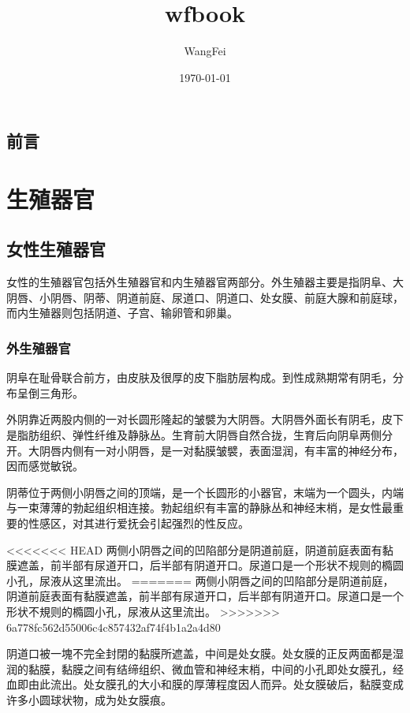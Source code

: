 \documentclass[12pt,UTF8]{ctexbook}
\title{\heiti\zihao{0} wfbook}
\author{WangFei}
\date{\today}
\begin{document}
\maketitle
\tableofcontents

\frontmatter

\chapter{前言}



\mainmatter

\part{生殖器官}

\chapter{女性生殖器官}

女性的生殖器官包括外生殖器官和内生殖器官两部分。外生殖器主要是指阴阜、大阴唇、小阴唇、阴蒂、阴道前庭、尿道口、阴道口、处女膜、前庭大腺和前庭球，而内生殖器则包括阴道、子宫、输卵管和卵巢。

\section{外生殖器官}

阴阜在耻骨联合前方，由皮肤及很厚的皮下脂肪层构成。到性成熟期常有阴毛，分布呈倒三角形。

外阴靠近两股内侧的一对长圆形隆起的皱襞为大阴唇。大阴唇外面长有阴毛，皮下是脂肪组织、弹性纤维及静脉丛。生育前大阴唇自然合拢，生育后向阴阜两侧分开。大阴唇内侧有一对小阴唇，是一对黏膜皱襞，表面湿润，有丰富的神经分布，因而感觉敏锐。

阴蒂位于两侧小阴唇之间的顶端，是一个长圆形的小器官，末端为一个圆头，内端与一束薄薄的勃起组织相连接。勃起组织有丰富的静脉丛和神经末梢，是女性最重要的性感区，对其进行爱抚会引起强烈的性反应。

<<<<<<< HEAD
两侧小阴唇之间的凹陷部分是阴道前庭，阴道前庭表面有黏膜遮盖，前半部有尿道开口，后半部有阴道开口。尿道口是一个形状不规则的橢圆小孔，尿液从这里流出。
=======
两侧小阴唇之间的凹陷部分是阴道前庭，阴道前庭表面有黏膜遮盖，前半部有尿道开口，后半部有阴道开口。尿道口是一个形状不規则的橢圆小孔，尿液从这里流出。
>>>>>>> 6a778fc562d55006c4c857432af74f4b1a2a4d80

阴道口被一塊不完全封閉的黏膜所遮盖，中间是处女膜。处女膜的正反两面都是湿润的黏膜，黏膜之间有结缔组织、微血管和神经末梢，中间的小孔即处女膜孔，经血即由此流出。处女膜孔的大小和膜的厚薄程度因人而异。处女膜破后，黏膜变成许多小圆球状物，成为处女膜痕。
\end{document}
